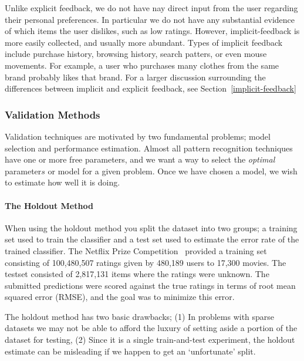 Unlike explicit feedback, we do not have nay direct input from the user
regarding their personal preferences. In particular we do not have any
substantial evidence of which items the user dislikes, such as low ratings.
However, implicit-feedback is more easily collected, and usually more abundant.
Types of implicit feedback include purchase history, browsing history, search patters, or even mouse movements. For example, a user who purchases many clothes from the same brand probably likes that brand. For a larger discussion surrounding the differences between
implicit and explicit feedback, see Section~\ref{implicit-feedback}



\subsubsection{Validation Methods}

Validation techniques are motivated by two fundamental problems; model
selection and performance estimation. Almost all pattern recognition techniques
have one or more free parameters, and we want a way to select the
\emph{optimal} parameter\(s\) or model for a given problem. Once we have chosen a
model, we wish to estimate how well it is doing.

\paragraph{The Holdout Method}

When using the holdout method you split the dataset into two groups; a training
set used to train the classifier and a test set used to estimate the error rate
of the trained classifier. The Netflix Prize Competition~\cite{Netflix}
provided a training set consisting of 100,480,507 ratings given by 480,189
users to 17,300 movies. The testset consisted of 2,817,131 items where the
ratings were unknown. The submitted predictions were scored against the true
ratings in terms of root mean squared error (RMSE), and the goal was to
minimize this error.

The holdout method has two basic drawbacks; (1) In problems with sparse
datasets we may not be able to afford the luxury of setting aside a portion of
the dataset for testing, (2) Since it is a single train-and-test experiment,
the holdout estimate can be misleading if we happen to get an `unfortunate'
split.

